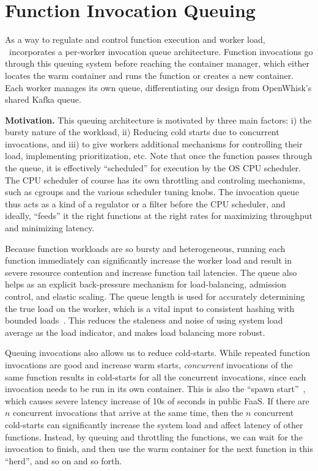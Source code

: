 \section{Function Invocation Queuing}
\label{sec:q}

As a way to regulate and control function execution and worker load, \sysname~incorporates a per-worker invocation queue architecture. 
Function invocations go through this queuing system before reaching the container manager, which either locates the warm container and runs the function or creates a new container.
Each worker manages its own queue, differentiating our design from OpenWhisk's shared Kafka queue. 

\noindent \textbf{Motivation.}
%
This queuing architecture is motivated by three main factors: i) the bursty nature of the workload, ii) Reducing cold starts due to concurrent invocations, and iii) to give workers additional mechanisms for controlling their load, implementing prioritization, etc. 
Note that once the function passes through the queue, it is effectively ``scheduled'' for execution by the OS CPU scheduler.
The CPU scheduler of course has its own throttling and controling mechanisms, such as cgroups and the various scheduler tuning knobs.
The invocation queue thus acts as a kind of a regulator or a filter before the CPU scheduler, and ideally, ``feeds'' it the right functions at the right rates for maximizing throughput and minimizing latency.
%

Because function workloads are so bursty and heterogeneous, running each function immediately can significantly increase the worker load and result in severe resource contention and increase  function tail latencies.
%
The queue also helps as an explicit back-pressure mechanism for load-balancing, admission control, and elastic scaling.
The queue length is  used for accurately determining the true load on the worker, which is a vital input to consistent hashing with bounded loads~\cite{faaslb-hpdc22}.
This reduces the staleness and noise of using system load average as the load indicator, and makes load balancing more robust.


Queuing invocations also allows us to reduce cold-starts.
While repeated function invocations are good and increase warm starts, 
\emph{concurrent} invocations of the same function results in cold-starts for all the concurrent invocations, since each invocation needs to be run in its own container.
This is also the ``spawn start''~\cite{ristov_colder_warmer}, which causes severe latency increase of 10s of  seconds in public FaaS. 
If there are $n$ concurrent invocations that arrive at the same time, then the $n$ concurrent cold-starts can significantly increase the system load and affect latency of other functions.
Instead, by queuing and throttling the functions, we can wait for the invocation to finish, and then use the warm container for the next function in this ``herd'', and so on and so forth. %

